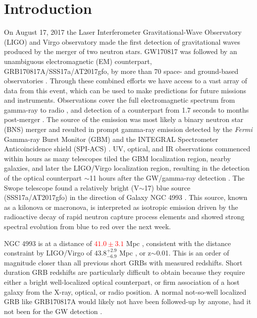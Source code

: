 \documentclass[modern]{aastex61}
\newcommand{\red}[1]{\textcolor{red}{#1}}
\begin{document}

\section{Introduction} \label{sec:intro}
On August 17, 2017 the Laser Interferometer Gravitational-Wave Observatory (LIGO) and Virgo observatory made the first detection of gravitational waves produced by the merger of two neutron stars.  GW170817 was followed by an unambiguous electromagnetic (EM) counterpart, GRB170817A/SSS17a/AT2017gfo, by more than 70 space- and ground-based observatories \citep{Abbott2017a,Abbott2017b,Abbott2017c}. Through these combined efforts we have access to a vast array of data from this event, which can be used to make predictions for future missions and instruments. Observations cover the full electromagnetic spectrum from gamma-ray to radio \citep{Goldstein2017,Savchenko2017,Troja2017,Evans2017,Coulter2017,Kim2017,Hallinan2017}, and detection of a counterpart from 1.7 seconds to months post-merger \citep{Abbott2017b}. The source of the emission was most likely a binary neutron star (BNS) merger \citep{Abbott2017a} and resulted in prompt gamma-ray emission detected by the {\it Fermi} Gamma-ray Burst Monitor (GBM) \citep{Goldstein2017} and the INTEGRAL Spectrometer Anticoincidence shield (SPI-ACS) \citep{Savchenko2017}. UV, optical, and IR observations commenced within hours as many telescopes tiled the GBM localization region, nearby galaxies, and later the LIGO/Virgo localization region, resulting in the detection of the optical counterpart $\sim$11 hours after the GW/gamma-ray detection \citep{Abbott2017c}. The Swope telescope found a relatively bright (V$\sim$17) blue source (SSS17a/AT2017gfo) in the direction of Galaxy NGC 4993 \citep{Coulter2017}. This source, known as a kilonova or macronova, is interpreted as isotropic emission driven by the radioactive decay of rapid neutron capture process elements and showed strong spectral evolution from blue to red over the next week.

NGC 4993 is at a distance of \red{$41.0\pm3.1$} Mpc \citep{Hjorth2017}, consistent with the distance constraint by LIGO/Virgo of $43.8^{+2.9}_{-6.9}$ Mpc \citep{Abbott2017d}, or z$\sim$0.01.  This is an order of magnitude closer than all previous short GRBs with measured redshifts. Short duration GRB redshifts are particularly difficult to obtain because they require either a bright well-localized optical counterpart, or firm association of a host galaxy from the X-ray, optical, or radio position.  A normal not-so-well localized GRB like GRB170817A would likely not have been followed-up by anyone, had it not been for the GW detection \citep{Goldstein2017}.
\end{document}

